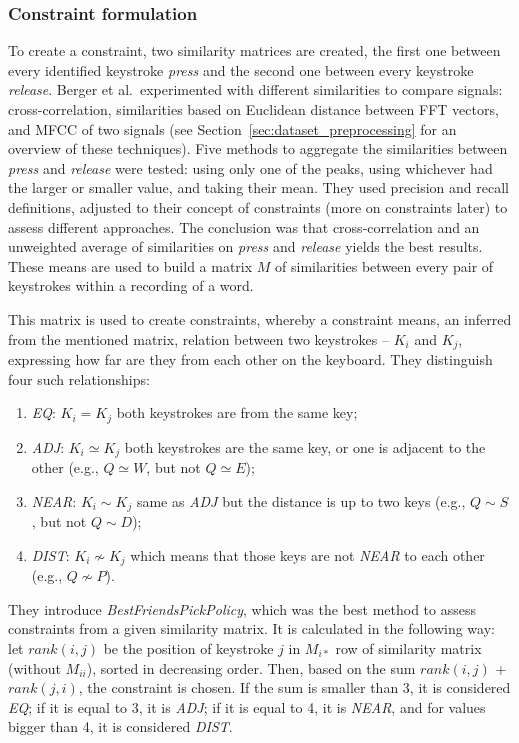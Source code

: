 \documentclass[../main.tex]{subfiles}
\begin{document}
\subsubsection{Constraint formulation}
To create a constraint, two similarity matrices are created, the first one between every identified keystroke \textit{press} and the second one between every keystroke \textit{release}. Berger et al.\ experimented with different similarities to compare signals: cross-correlation, similarities based on Euclidean distance between FFT vectors, and MFCC of two signals (see Section~\ref{sec:dataset_preprocessing} for an overview of these techniques). Five methods to aggregate the similarities between \textit{press} and \textit{release} were tested: using only one of the peaks, using whichever had the larger or smaller value, and taking their mean. They used precision and recall definitions, adjusted to their concept of constraints (more on constraints later) to assess different approaches. The conclusion was that cross-correlation and an unweighted average of similarities on \textit{press} and \textit{release} yields the best results.
These means are used to build a matrix $M$ of similarities between every pair of keystrokes within a recording of a word.


This matrix is used to create constraints, whereby a constraint means, an inferred from the mentioned matrix, relation between two keystrokes -- $K_i$ and $K_j$, expressing how far are they from each other on the keyboard. They distinguish four such relationships:
\begin{enumerate}
    \item \textit{EQ}: $K_i = K_j$ both keystrokes are from the same key;
    \item  \textit{ADJ}: $K_i \simeq K_j$ both keystrokes are the same key, or one is adjacent to the other (e.g., $Q \simeq W$, but not $Q \simeq E$);
    \item \textit{NEAR}: $K_i \sim K_j$ same as \textit{ADJ} but the distance is up to two keys (e.g., $Q \sim S$, but not $Q \sim D$);
    \item  \textit{DIST}: $K_i \nsim K_j$ which means that those keys are not \textit{NEAR} to each other (e.g., $Q \nsim P$).
\end{enumerate}

They introduce \textit{BestFriendsPickPolicy}, which was the best method to assess constraints from a given similarity matrix. It is calculated in the following way: let $rank(i, j)$ be the position of keystroke $j$ in $M_{i*}$ row of similarity matrix (without $M_{ii}$), sorted in decreasing order. Then, based on the sum $rank(i, j)$ + $rank(j, i)$, the constraint is chosen. If the sum is smaller than 3, it is considered \textit{EQ}; if it is equal to 3, it is \textit{ADJ}; if it is equal to 4, it is \textit{NEAR}, and for values bigger than 4, it is considered \textit{DIST}.
\end{document}
